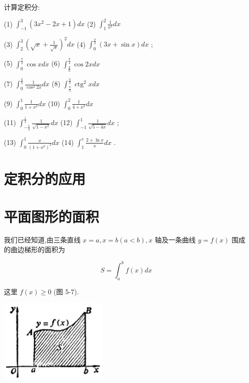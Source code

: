 \documentclass[lang=cn,newtx,10pt,scheme=chinese]{elegantbook}
\begin{document}
\begin{problemset}[习 题 十 五]

\item 计算定积分:

(1) \({\int }_{-1}^{3}\left( {3{x}^{2} - {2x} + 1}\right) {dx}\) (2) \({\int }_{1}^{2}\frac{1}{{x}^{2}}{dx}\)

(3) \({\int }_{2}^{3}{\left( \sqrt{x} + \frac{1}{\sqrt{x}}\right) }^{2}{dx}\) (4) \({\int }_{0}^{\frac{\pi }{2}}\left( {{3x} + \sin x}\right) {dx}\) ;

(5) \({\int }_{0}^{\frac{\pi }{2}}\cos {xdx}\) (6) \({\int }_{\frac{\pi }{6}}^{\frac{\pi }{4}}\cos {2xdx}\)

(7) \({\int }_{0}^{\frac{\pi }{6}}\frac{1}{{\cos }^{2}{2x}}{dx}\) (8) \({\int }_{\frac{\pi }{4}}^{\frac{\pi }{3}}{\operatorname{ctg}}^{2}{xdx}\)

(9) \({\int }_{0}^{1}\frac{1}{1 + {x}^{2}}{dx}\) (10) \({\int }_{0}^{2}\frac{1}{4 + {x}^{2}}{dx}\)

(11) \({\int }_{-\frac{1}{2}}^{\frac{1}{2}}\frac{1}{\sqrt{1 - {x}^{2}}}{dx}\) (12) \({\int }_{-1}^{1}\frac{1}{\sqrt{5 - {4x}}}{dx}\) ;

(13) \({\int }_{0}^{1}\frac{x}{{\left( 1 + {x}^{2}\right) }^{3}}{dx}\) (14) \({\int }_{1}^{e}\frac{2 + \ln x}{x}{dx}\) .

\end{problemset}

\section*{定积分的应用}

\section{平面图形的面积}

我们已经知道,由三条直线 \(x = a,x = b\left( {a < b}\right) ,x\) 轴及一条曲线 \(y = f\left( x\right)\) 围成的曲边梯形的面积为

\[
S = {\int }_{a}^{b}f\left( x\right) {dx}
\]

这里 \(f\left( x\right) \geq 0\) (图 5-7).

\begin{center}
\includegraphics[max width=0.4\textwidth]{images/01912c18-5c3f-733d-b775-749ba9897a9d_232_528761.jpg}
\end{center}
\end{document}
